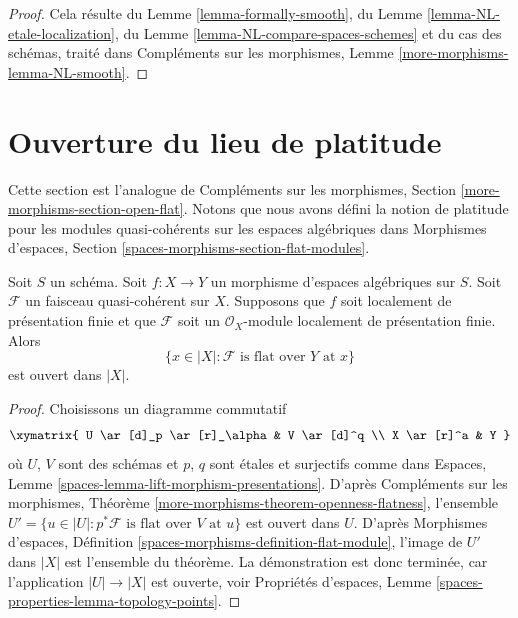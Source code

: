 \begin{proof}
Cela résulte du
Lemme \ref{lemma-formally-smooth}, du
Lemme \ref{lemma-NL-etale-localization}, du
Lemme \ref{lemma-NL-compare-spaces-schemes}
et du cas des schémas, traité dans
Compléments sur les morphismes, Lemme \ref{more-morphisms-lemma-NL-smooth}.
\end{proof}











\section{Ouverture du lieu de platitude}
\label{section-open-flat}

\noindent
Cette section est l'analogue de
Compléments sur les morphismes, Section \ref{more-morphisms-section-open-flat}.
Notons que nous avons défini la notion de platitude pour les modules
quasi-cohérents sur les espaces algébriques dans
Morphismes d'espaces, Section \ref{spaces-morphisms-section-flat-modules}.

\begin{theorem}
\label{theorem-openness-flatness}
Soit $S$ un schéma.
Soit $f : X \to Y$ un morphisme d'espaces algébriques sur $S$.
Soit $\mathcal{F}$ un faisceau quasi-cohérent sur $X$.
Supposons que $f$ soit localement de présentation finie et que
$\mathcal{F}$ soit un $\mathcal{O}_X$-module
localement de présentation finie. Alors
$$
\{x \in |X| : \mathcal{F}\text{ is flat over }Y\text{ at }x\}
$$
est ouvert dans $|X|$.
\end{theorem}

\begin{proof}
Choisissons un diagramme commutatif
$$
\xymatrix{
U \ar[d]_p \ar[r]_\alpha &
V \ar[d]^q \\
X \ar[r]^a & Y
}
$$
où $U$, $V$ sont des schémas et $p$, $q$ sont étales et surjectifs comme dans
Espaces, Lemme \ref{spaces-lemma-lift-morphism-presentations}.
D'après
Compléments sur les morphismes, Théorème \ref{more-morphisms-theorem-openness-flatness},
l'ensemble
$U' = \{u \in |U| : p^*\mathcal{F}\text{ is flat over }V\text{ at }u\}$
est ouvert dans $U$. D'après
Morphismes d'espaces, Définition \ref{spaces-morphisms-definition-flat-module},
l'image de $U'$ dans $|X|$ est l'ensemble
du théorème. La démonstration est donc terminée, car l'application $|U| \to |X|$ est
ouverte, voir
Propriétés d'espaces, Lemme \ref{spaces-properties-lemma-topology-points}.
\end{proof}

